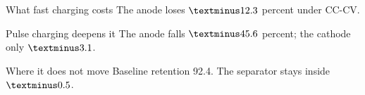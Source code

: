\begin{frame}{What fast charging costs}
  The anode loses $\textminus12.3$ percent under CC-CV.
\end{frame}

\begin{frame}{Pulse charging deepens it}
  The anode falls $\textminus45.6$ percent; the cathode only $\textminus3.1$.
\end{frame}

\begin{frame}{Where it does not move}
  Baseline retention 92.4. The separator stays inside $\textminus0.5$.
\end{frame}
